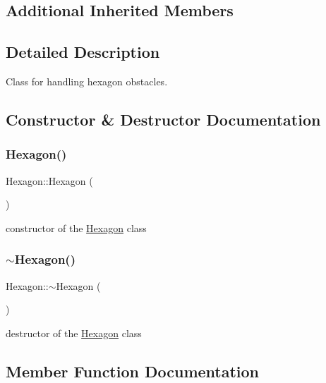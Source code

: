 \subsection*{Additional Inherited Members}


\subsection{Detailed Description}
Class for handling hexagon obstacles. 

\subsection{Constructor \& Destructor Documentation}
\mbox{\label{class_hexagon_ab503950412a7f11dab9c697c45b614a2}} 
\subsubsection{\texorpdfstring{Hexagon()}{Hexagon()}}
{\footnotesize\ttfamily Hexagon\+::\+Hexagon (\begin{DoxyParamCaption}{ }\end{DoxyParamCaption})}

constructor of the \mbox{\hyperlink{class_hexagon}{Hexagon}} class \mbox{\label{class_hexagon_aaaa69a37657fe47cad3c17d7c3569318}} 
\subsubsection{\texorpdfstring{$\sim$\+Hexagon()}{~Hexagon()}}
{\footnotesize\ttfamily Hexagon\+::$\sim$\+Hexagon (\begin{DoxyParamCaption}{ }\end{DoxyParamCaption})}

destructor of the \mbox{\hyperlink{class_hexagon}{Hexagon}} class 

\subsection{Member Function Documentation}
\mbox{\label{class_hexagon_aa12df068505254931530cbe74ac85ad0}} 
